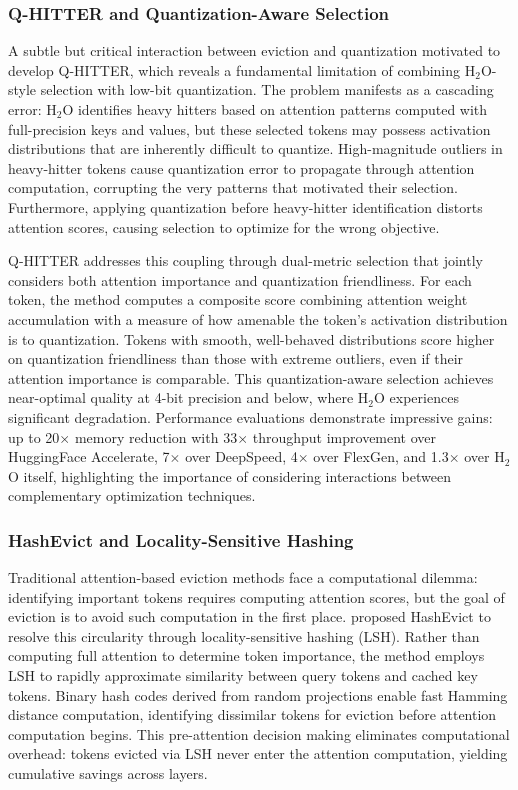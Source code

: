 \documentclass[11pt,letterpaper]{article}
\begin{document}
\subsubsection{Q-HITTER and Quantization-Aware Selection}

A subtle but critical interaction between eviction and quantization motivated \cite{kang2024qhitter} to develop Q-HITTER, which reveals a fundamental limitation of combining H$_2$O-style selection with low-bit quantization. The problem manifests as a cascading error: H$_2$O identifies heavy hitters based on attention patterns computed with full-precision keys and values, but these selected tokens may possess activation distributions that are inherently difficult to quantize. High-magnitude outliers in heavy-hitter tokens cause quantization error to propagate through attention computation, corrupting the very patterns that motivated their selection. Furthermore, applying quantization before heavy-hitter identification distorts attention scores, causing selection to optimize for the wrong objective.

Q-HITTER addresses this coupling through dual-metric selection that jointly considers both attention importance and quantization friendliness. For each token, the method computes a composite score combining attention weight accumulation with a measure of how amenable the token's activation distribution is to quantization. Tokens with smooth, well-behaved distributions score higher on quantization friendliness than those with extreme outliers, even if their attention importance is comparable. This quantization-aware selection achieves near-optimal quality at 4-bit precision and below, where H$_2$O experiences significant degradation. Performance evaluations demonstrate impressive gains: up to 20$\times$ memory reduction with 33$\times$ throughput improvement over HuggingFace Accelerate, 7$\times$ over DeepSpeed, 4$\times$ over FlexGen, and 1.3$\times$ over H$_2$O itself, highlighting the importance of considering interactions between complementary optimization techniques.

\subsubsection{HashEvict and Locality-Sensitive Hashing}

Traditional attention-based eviction methods face a computational dilemma: identifying important tokens requires computing attention scores, but the goal of eviction is to avoid such computation in the first place. \cite{liu2024hashevict} proposed HashEvict to resolve this circularity through locality-sensitive hashing (LSH). Rather than computing full attention to determine token importance, the method employs LSH to rapidly approximate similarity between query tokens and cached key tokens. Binary hash codes derived from random projections enable fast Hamming distance computation, identifying dissimilar tokens for eviction before attention computation begins. This pre-attention decision making eliminates computational overhead: tokens evicted via LSH never enter the attention computation, yielding cumulative savings across layers.
\end{document}
